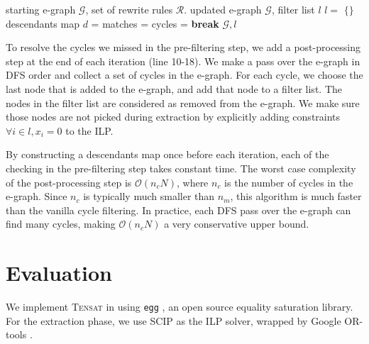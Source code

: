 \documentclass{article}
\newcommand{\ourname}[0]{\textsc{Tensat}}
\begin{document}
\begin{algorithm}[t]
\small
\caption{Exploration phase with efficient cycle filtering}
\label{alg:cycle}
\begin{algorithmic}[1]
\Require starting e-graph $\mathcal{G}$, set of rewrite rules $\mathcal{R}$.
\Ensure updated e-graph $\mathcal{G}$, filter list $l$
  \State $l = $ $\{\}$
    \State descendants map $d$ = 
    \State matches =  
        \State {}
      \EndIf
    \EndFor
      \State cycles = 
        \State \textbf{break}
      \EndIf
        \State {}
      \EndFor
    \EndWhile
  \EndFor
  \State \Return $\mathcal{G}, l$
\end{algorithmic}
\end{algorithm}

To resolve the cycles we missed in the pre-filtering step, we add a post-processing step at the end of each iteration (line 10-18).
We make a pass over the e-graph in DFS order and collect a set of cycles in the e-graph. 
For each cycle, we choose the last node that is added to the e-graph, and add that node to a filter list. 
The nodes in the filter list are considered as removed from the e-graph. 
We make sure those nodes are not picked during extraction by explicitly adding constraints $\forall i \in l, x_i = 0$ to the ILP.

By constructing a descendants map once before each iteration, each of the checking in the pre-filtering step takes constant time. 
The worst case complexity of the post-processing step is $\mathcal{O}(n_c N)$, where $n_c$ is the number of cycles in the e-graph.
Since $n_c$ is typically much smaller than $n_m$, this algorithm is much faster than the vanilla cycle filtering. 
In practice, each DFS pass over the e-graph can find many cycles, making $\mathcal{O}(n_c N)$ a very conservative upper bound.

\section{Evaluation}

We implement \ourname{} in \citet{rust} using \texttt{egg} \cite{egg}, an open source equality saturation library.
For the extraction phase, we use SCIP \cite{scip} as the ILP solver, wrapped by Google OR-tools \cite{ortools}. 
\end{document}

